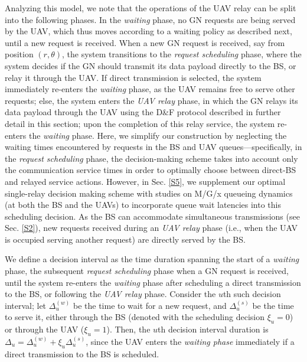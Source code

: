 \documentclass[12pt, draftcls, onecolumn]{IEEEtran}
\theoremstyle{plain}
\theoremstyle{definition}
\theoremstyle{remark}
\begin{document}
Analyzing this model, we note that the operations of the UAV relay can be split into the following phases. In the \emph{waiting} phase, no GN requests are being served by the UAV, which thus moves according to a waiting policy as described next, until a new request is received. When a new GN request is received, say from position $(r,\theta)$, the system transitions to the \emph{request scheduling} phase, where the system decides if the GN should transmit its data payload directly to the BS, or relay it through the UAV. If direct transmission is selected, the system immediately re-enters the \emph{waiting} phase, as the UAV remains free to serve other requests; else, the system enters the \emph{UAV relay} phase, in which the GN relays its data payload through the UAV using the D\&F protocol described in further detail in this section; upon the completion of this relay service, the system re-enters the \emph{waiting} phase. Here, we simplify our construction by neglecting the waiting times encountered by requests in the BS and UAV queues---specifically, in the \emph{request scheduling} phase, the decision-making scheme takes into account only the communication service times in order to optimally choose between direct-BS and relayed service actions. However, in Sec. \ref{S5}, we supplement our optimal single-relay decision making scheme with studies on M/G/x queueing dynamics (at both the BS and the UAVs) to incorporate queue wait latencies into this scheduling decision. As the BS can accommodate simultaneous transmissions (see Sec. \ref{S2}), new requests received during an \emph{UAV relay} phase (i.e., when the UAV is occupied serving another request) are directly served by the BS.

We define a decision interval as the time duration spanning the start of a \emph{waiting} phase, the subsequent \emph{request scheduling} phase when a GN request is received, until the system re-enters the \emph{waiting} phase after scheduling a direct transmission to the BS, or following the \emph{UAV relay} phase. Consider the $u$th such decision interval; let $\Delta_{u}^{(w)}$ be the time to wait for a new request, and $\Delta_{u}^{(s)}$ be the time to serve it, either through the BS (denoted with the scheduling decision $\xi_{u}{=}0$) or through the UAV ($\xi_{u}{=}1$).  Then, the $u$th decision interval duration is $\Delta_{u}{=}\Delta_{u}^{(w)}{+}\xi_{u}\Delta_{u}^{(s)}$, since the UAV enters the \emph{waiting phase} immediately if a direct transmission to the BS is scheduled.
\end{document}
